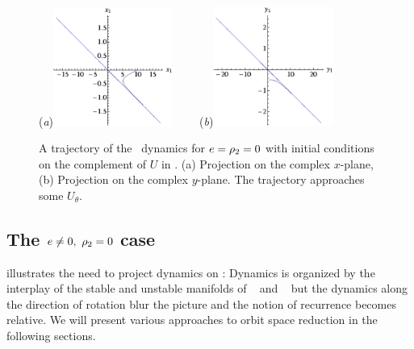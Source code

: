 \begin{figure}[t]
\begin{center}
  (\textit{a})\includegraphics[width=0.35\textwidth]{../figs/CLe0transA}
~~~~(\textit{b})\includegraphics[width=0.35\textwidth]{../figs/CLe0transB}
\end{center}
\caption[Transient trajectory in degenerate Complex Lorenz flow]{ A trajectory
of the \CLe\ dynamics for $e=\rho_2=0$ with
initial conditions on the complement of $U$ in . (a) Projection on the
complex $x$-plane, (b) Projection on the complex $y$-plane. The trajectory
approaches some $U_\theta$.
    }
\label{fig:CLe0trans}
\end{figure}

\subsection{The $e\neq0,\ \ImrCLor=0$ case}
\label{sect:coordChange}

 illustrates the need
to project dynamics on \reducedsp: Dynamics is organized by
the interplay of the stable and unstable manifolds of \eqv\
 and \reqv\  but the dynamics along the
direction of rotation blur the picture and the notion of
recurrence becomes relative. We will present various
approaches to orbit space reduction in the following
sections.

